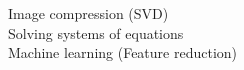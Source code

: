 \documentclass[preview]{standalone}
\begin{document}
Image compression (SVD)\\Solving systems of equations\\Machine learning (Feature reduction)\\
\end{document}
